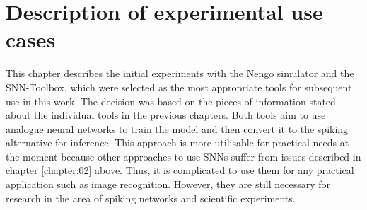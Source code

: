 \chapter{Description of experimental use cases} \label{chapter:05}

This chapter describes the initial experiments with the Nengo simulator and the SNN-Toolbox, which were selected as the most appropriate tools for subsequent use in this work. The decision was based on the pieces of information stated about the individual tools in the previous chapters. Both tools aim to use analogue neural networks to train the model and then convert it to the spiking alternative for inference. This approach is more utilisable for practical needs at the moment because other approaches to use SNNs suffer from issues described in chapter \ref{chapter:02} above. Thus, it is complicated to use them for any practical application such as image recognition. However, they are still necessary for research in the area of spiking networks and scientific experiments. \par
